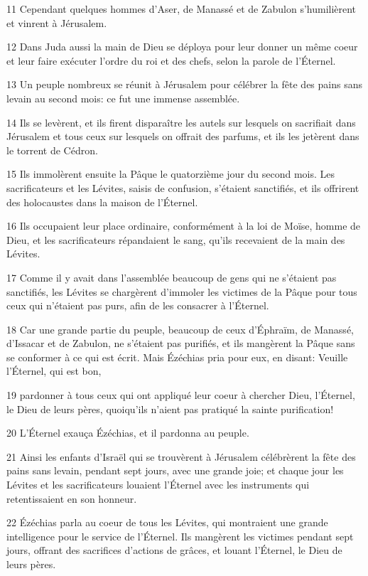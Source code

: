 \par 11 Cependant quelques hommes d'Aser, de Manassé et de Zabulon s'humilièrent et vinrent à Jérusalem.
\par 12 Dans Juda aussi la main de Dieu se déploya pour leur donner un même coeur et leur faire exécuter l'ordre du roi et des chefs, selon la parole de l'Éternel.
\par 13 Un peuple nombreux se réunit à Jérusalem pour célébrer la fête des pains sans levain au second mois: ce fut une immense assemblée.
\par 14 Ils se levèrent, et ils firent disparaître les autels sur lesquels on sacrifiait dans Jérusalem et tous ceux sur lesquels on offrait des parfums, et ils les jetèrent dans le torrent de Cédron.
\par 15 Ils immolèrent ensuite la Pâque le quatorzième jour du second mois. Les sacrificateurs et les Lévites, saisis de confusion, s'étaient sanctifiés, et ils offrirent des holocaustes dans la maison de l'Éternel.
\par 16 Ils occupaient leur place ordinaire, conformément à la loi de Moïse, homme de Dieu, et les sacrificateurs répandaient le sang, qu'ils recevaient de la main des Lévites.
\par 17 Comme il y avait dans l'assemblée beaucoup de gens qui ne s'étaient pas sanctifiés, les Lévites se chargèrent d'immoler les victimes de la Pâque pour tous ceux qui n'étaient pas purs, afin de les consacrer à l'Éternel.
\par 18 Car une grande partie du peuple, beaucoup de ceux d'Éphraïm, de Manassé, d'Issacar et de Zabulon, ne s'étaient pas purifiés, et ils mangèrent la Pâque sans se conformer à ce qui est écrit. Mais Ézéchias pria pour eux, en disant: Veuille l'Éternel, qui est bon,
\par 19 pardonner à tous ceux qui ont appliqué leur coeur à chercher Dieu, l'Éternel, le Dieu de leurs pères, quoiqu'ils n'aient pas pratiqué la sainte purification!
\par 20 L'Éternel exauça Ézéchias, et il pardonna au peuple.
\par 21 Ainsi les enfants d'Israël qui se trouvèrent à Jérusalem célébrèrent la fête des pains sans levain, pendant sept jours, avec une grande joie; et chaque jour les Lévites et les sacrificateurs louaient l'Éternel avec les instruments qui retentissaient en son honneur.
\par 22 Ézéchias parla au coeur de tous les Lévites, qui montraient une grande intelligence pour le service de l'Éternel. Ils mangèrent les victimes pendant sept jours, offrant des sacrifices d'actions de grâces, et louant l'Éternel, le Dieu de leurs pères.
